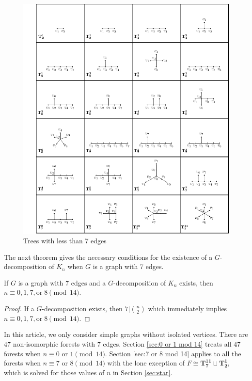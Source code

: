 \documentclass{dmgt}
\begin{document}
\begin{figure}[]
\centering
    \includegraphics{tree chart.pdf}
    \caption{Trees with less than 7 edges}
    \label{fig:catalog}
\end{figure}
The next theorem gives the necessary conditions for the existence of a $G$-decomposition of $K_n$ when $G$ is a graph with 7 edges.

\begin{theorem}
  If $G$ is a graph with $7$ edges and a $G$-decomposition of $K_n$ exists, then $n \equiv 0,1,7, \textrm{or} \; 8 \pmod{14}.$  
\end{theorem}
\begin{proof}
    If a $G$-decomposition exists, then $7 | \binom{n}{2}$ which immediately implies $n \equiv 0,1,7, \textrm{or} \; 8 \pmod{14}.$
\end{proof}

In this article, we only consider simple graphs without isolated vertices. There are $47$ non-isomorphic forests with $7$ edges. Section \ref{sec:0 or 1 mod 14} treats all $47$ forests when $n \equiv 0 \textrm{ or } 1 \pmod{14}$. Section \ref{sec:7 or 8 mod 14} applies to all the forests when $n \equiv 7 \textrm{ or } 8 \pmod{14}$ with the lone exception of $F \cong \mathbf{T_{7}^{11}}\sqcup\mathbf{T_{2}^{1}},$ which  is solved for those values of $n$ in Section \ref{sec:star}. 
\end{document}
